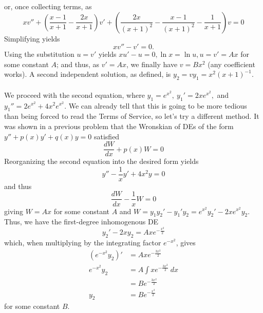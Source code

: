 \documentclass{article}
\begin{document}
or, once collecting terms, as 
\begin{equation*}
    xv'' + (\frac{x-1}{x+1} - \frac{2x}{x+1})v' +(\frac{2x}{(x+1)^2} - \frac{x-1}{(x+1)^2} - \frac{1}{x+1})v = 0
\end{equation*}
Simplifying yields
\begin{equation*}
    xv'' - v' = 0.
\end{equation*}
Using the substitution $u = v'$ yields $xu'-u=0, \ln x = \ln u, u = v' = Ax$ for some constant $A$; and thus, as $v' = Ax$, we finally have $v = Bx^2$ (any coefficient works). A second independent solution, as defined, is $y_2 = vy_1 = x^2(x+1)^{-1}$.\\ \\
We proceed with the second equation, where $y_1 = e^{x^2},\ y_1' = 2xe^{x^2}, $ and $y_1'' = 2e^{x^2} + 4x^2e^{x^2}$. We can already tell that this is going to be more tedious than being forced to read the Terms of Service, so let's try a different method. It was shown in a previous problem that the Wronskian of DEs of the form $y''+p(x)y'+q(x)y = 0$ satisfied
\begin{equation*}
    \frac{dW}{dx} + p(x)W = 0
\end{equation*}
Reorganizing the second equation into the desired form yields
\begin{equation*}
y'' - \frac{1}{x} y' + 4x^2y = 0
\end{equation*}
and thus
\begin{equation*}
    \frac{dW}{dx} - \frac{1}{x}W = 0
\end{equation*}
giving $W = Ax$ for some constant $A$ and $W = y_1y_2' - y_1'y_2 = e^{x^2}y_2' - 2xe^{x^2}y_2$. Thus, we have the first-degree inhomogenous DE 
\begin{equation*}
    y_2' - 2xy_2 = Axe^{-\frac{x^2}{2}}
\end{equation*}
which, when multiplying by the integrating factor $e^{-x^2}$, gives
\begin{equation*}
    \begin{aligned}
    (e^{-x^2}y_2)' &= Axe^{-\frac{3x^2}{2}} \\
    e^{-x^2}y_2 &= A\int xe^{-\frac{3x^2}{2}}\ dx \\
    &= Be^{-\frac{3x^2}{2}} \\
    y_2 &= Be^{-\frac{x^2}{2}}
\end{aligned}
\end{equation*}
for some constant $B$.

\hrulefill
\end{document}
